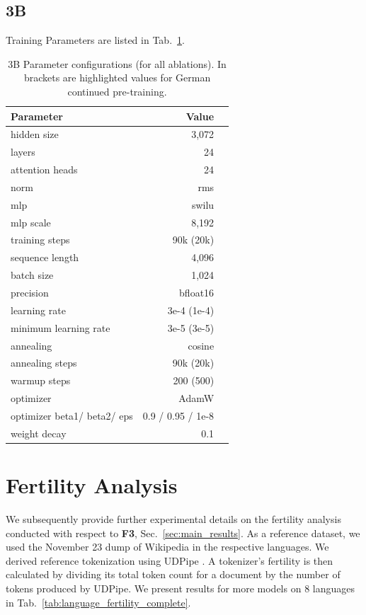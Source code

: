 \documentclass[11pt]{article}
\begin{document}
\subsection{3B}
Training Parameters are listed in Tab.~\ref{tab:3b_parameters}.

\begin{table}[]
    \centering
\begin{tabular}{lrr}
\toprule
         Parameter & Value \\
\midrule
hidden size & 3,072 \\
layers &  24 \\
attention heads & 24 \\
norm & rms \\
mlp & swilu \\
mlp scale & 8,192 \\
training steps & 90k (20k) \\
sequence length & 4,096 \\
batch size & 1,024 \\
\midrule
precision & bfloat16 \\
learning rate &  3e-4 (1e-4) \\
minimum learning rate & 3e-5 (3e-5)\\
annealing & cosine \\
annealing steps & 90k (20k) \\
warmup steps & 200 (500) \\
optimizer & AdamW \\
optimizer beta1/ beta2/ eps & 0.9 / 0.95 / 1e-8 \\
weight decay & 0.1 \\
\bottomrule
    \end{tabular}
    \caption{3B Parameter configurations (for all ablations). In brackets are highlighted values for German continued pre-training.}
    \label{tab:3b_parameters}
\end{table}

\section{Fertility Analysis}
\label{app:fertility}
We subsequently provide further experimental details on the fertility analysis conducted with respect to \textbf{F3}, Sec.~\ref{sec:main_results}. 
As a reference dataset, we used the November 23 dump of Wikipedia in the respective languages. We derived reference tokenization using UDPipe \cite{straka-2018-udpipe}. A tokenizer's fertility is then calculated by dividing its total token count for a document by the number of tokens produced by UDPipe.
We present results for more models on 8 languages in Tab.~\ref{tab:language_fertility_complete}.
\end{document}
